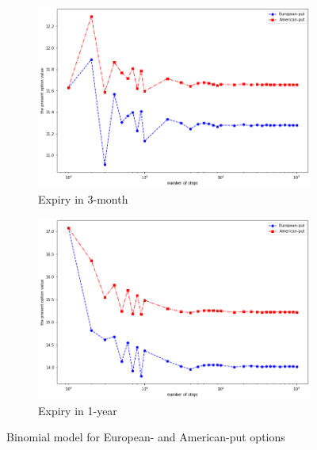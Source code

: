 \begin{figure}[H]
    \centering
    \begin{subfigure}[b]{0.45\textwidth}
        \includegraphics[width=\textwidth]{figure/binomial_model_euam_put_025.png}
        \caption{Expiry in 3-month}
    \end{subfigure}
    \begin{subfigure}[b]{0.45\textwidth}
        \includegraphics[width=\textwidth]{figure/binomial_model_euam_put_100.png}
        \caption{Expiry in 1-year}
    \end{subfigure}
    \caption{Binomial model for European- and American-put options}
    \label{fig:binomial_euam_put}
\end{figure}



